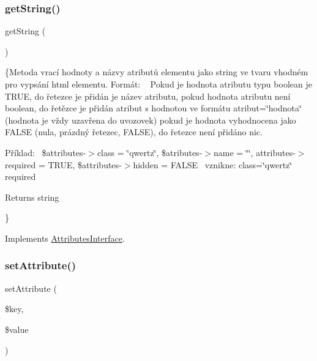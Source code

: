 \subsubsection{\texorpdfstring{get\+String()}{getString()}}
{\footnotesize\ttfamily get\+String (\begin{DoxyParamCaption}{ }\end{DoxyParamCaption})}

\{Metoda vrací hodnoty a názvy atributů elementu jako string ve tvaru vhodném pro vypsání html elementu. Formát\+: ~\newline
 Pokud je hodnota atributu typu boolean je T\+R\+UE, do řetezce je přidán je název atributu, pokud hodnota atributu není boolean, do řetězce je přidán atribut s hodnotou ve formátu atribut=\char`\"{}hodnota\char`\"{} (hodnota je vždy uzavřena do uvozovek) pokud je hodnota vyhodnocena jako F\+A\+L\+SE (nula, prázdný řetezec, F\+A\+L\+SE), do řetezce není přidáno nic.

Příklad\+:~\newline
 {\ttfamily \$attributes-\/$>$class = \char`\"{}qwertz\char`\"{}, \$atributes-\/$>$name = \char`\"{}\char`\"{}, attributes-\/$>$required = T\+R\+UE, \$attributes-\/$>$hidden = F\+A\+L\+SE}~\newline
 vznikne\+: class=\char`\"{}qwertz\char`\"{} required

\begin{DoxyReturn}{Returns}
string
\end{DoxyReturn}
\} 

Implements \mbox{\hyperlink{interface_pes_1_1_dom_1_1_node_1_1_attributes_1_1_attributes_interface_afde980915cc78c408e6ac75b662e631c}{Attributes\+Interface}}.

\mbox{\label{class_pes_1_1_dom_1_1_node_1_1_attributes_1_1_attributes_abstract_a0510466da552b21cc2be4e4c4119a5bb}} 
\subsubsection{\texorpdfstring{set\+Attribute()}{setAttribute()}}
{\footnotesize\ttfamily set\+Attribute (\begin{DoxyParamCaption}\item[{}]{\$key,  }\item[{}]{\$value }\end{DoxyParamCaption})}


